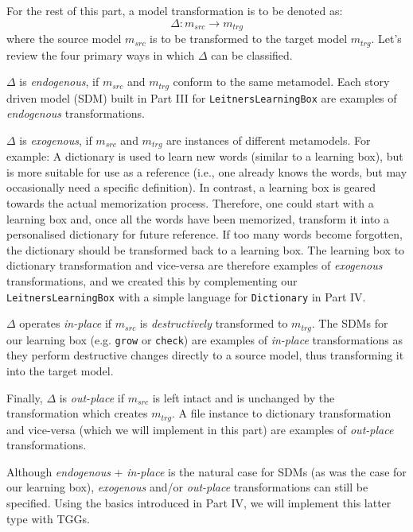 For the rest of this part, a model transformation is to be denoted as:
\begin{displaymath}
 	\Delta: m_{src} \rightarrow m_{trg}
\end{displaymath}
where the source model $m_{src}$ is to be transformed to the target model $m_{trg}$. Let's review the four primary ways in which $\Delta$ can be classified.

$\Delta$ is \emph{endogenous}, if $m_{src}$ and $m_{trg}$ conform to the same metamodel. Each story driven model (SDM) built in Part III for
\texttt{LeitnersLearningBox} are examples of \emph{endogenous} transformations.

$\Delta$ is \emph{exogenous}, if $m_{src}$ and $m_{trg}$ are instances of different metamodels. For example: A dictionary is used to learn new
words (similar to a learning box), but is more suitable for use as a reference (i.e., one already knows the words, but may occasionally need a specific
definition). In contrast, a learning box is geared towards the actual memorization process. Therefore, one could start with a learning box and, once all the
words have been memorized, transform it into a personalised dictionary for future reference. If too many words become forgotten, the dictionary should be
transformed back to a learning box. The learning box to dictionary transformation and vice-versa are therefore examples of \emph{exogenous}
transformations, and we created this by complementing our \texttt{LeitnersLearningBox} with a simple language for \texttt{Dictionary} in Part IV.

$\Delta$ operates \emph{in-place} if $m_{src}$ is \emph{destructively} transformed to $m_{trg}$. The SDMs for our learning box (e.g.
\texttt{grow} or \texttt{check}) are examples of \emph{in-place} transformations as they perform destructive changes directly to a source model, thus
transforming it into the target model.

Finally, $\Delta$ is \emph{out-place} if $m_{src}$ is left intact and is unchanged by the transformation which creates $m_{trg}$. A file
instance to dictionary transformation and vice-versa (which we will implement in this part) are examples of \emph{out-place} transformations.

Although \emph{endogenous} + \emph{in-place} is the natural case for SDMs (as was the case for our learning box), \emph{exogenous} and/or \emph{out-place}
transformations can still be specified. Using the basics introduced in Part IV, we will implement this latter type with TGGs.
 
